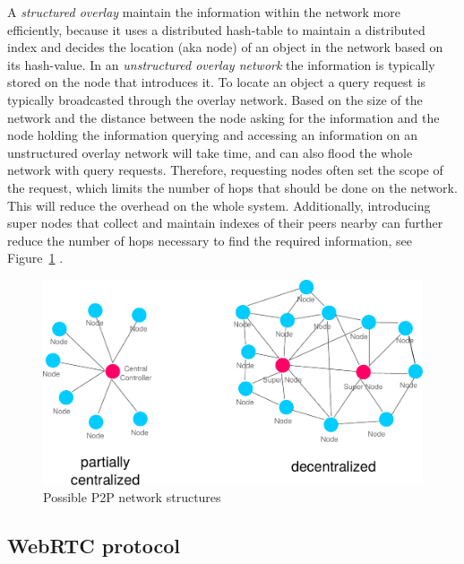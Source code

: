 A \emph{structured overlay} maintain the information within the network more efficiently, because it uses a distributed hash-table to maintain a distributed index and decides the location (aka node) of an object in the network based on its hash-value. In an \emph{unstructured overlay network} the information is typically stored on the node that introduces it. To locate an object a query request is typically broadcasted through the overlay network. Based on the size of the network and the distance between the node asking for the information and the node holding the information querying and accessing an information on an unstructured overlay network will take time, and can also flood the whole network with query requests. Therefore, requesting nodes often set the scope of the request, which limits the number of hops that should be done on the network. This will reduce the overhead on the whole system. Additionally, introducing super nodes that collect and maintain indexes of their peers nearby can further reduce the number of hops necessary to find the required information, see Figure~\ref{fig:p2p_network_structures} \citep{rodrigues2010peer}. \@

\begin{figure}[H]
	\centering
		\includegraphics[width=0.8\columnwidth]{images/p2p_network_structures.pdf}
	\caption{Possible \gls{P2P} network structures}
\label{fig:p2p_network_structures}
\end{figure}


\subsection{\gls{WebRTC} protocol}
\label{sec:p2p_webrtc}



